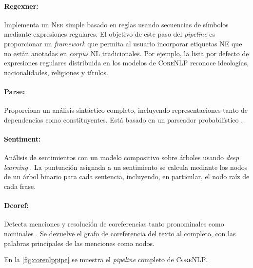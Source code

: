 \paragraph{Regexner:} Implementa un \textsc{Ner} simple basado en reglas usando
secuencias de símbolos mediante expresiones regulares. El objetivo de este paso
del \emph{pipeline} es proporcionar un \emph{framework} que permita al usuario
incorporar etiquetas \textsc{NE} que no están anotadas en \emph{corpus}
\textsc{NL} tradicionales. Por ejemplo, la lista por defecto de expresiones
regulares distribuida en los modelos de \textsc{CoreNLP} reconoce ideologías,
nacionalidades, religiones y títulos.

\paragraph{Parse:} Proporciona un análisis sintáctico completo, incluyendo
representaciones tanto de dependencias como constituyentes. Está basado en un
parseador probabilístico \cite{Klein2002, deMarneffe2008}.

\paragraph{Sentiment:} Análisis de sentimientos con un modelo compositivo sobre
árboles usando \emph{deep learning} \cite{socher2013}. La puntuación asignada a
un sentimiento se calcula mediante los nodos de un árbol binario para cada
sentencia, incluyendo, en particular, el nodo raíz de cada frase.

\paragraph{Dcoref:} Detecta menciones y resolución de coreferencias tanto pronominales como
nominales \cite{Lee2013}. Se devuelve el grafo de coreferencia del texto al
completo, con las palabras principales de las menciones como nodos.

En la \autoref{fig:corenlppipe} se muestra el \emph{pipeline} completo de \textsc{CoreNLP}.

